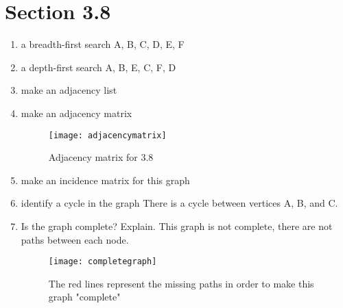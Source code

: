 \documentclass[11pt]{article}
\begin{document}
\section*{Section 3.8}
\begin{enumerate}
    \item a breadth-first search \newline
    A, B, C, D, E, F
    
    \item a depth-first search \newline
    A, B, E, C, F, D
    
    \item make an adjacency list
    
    \item make an adjacency matrix
    \begin{figure}
        \centering
        \texttt{[image: adjacencymatrix]}
        \caption{Adjacency matrix for 3.8}
        \label{fig:my_label}
    \end{figure}
    \item make an incidence matrix for this graph
    
    \item identify a cycle in the graph \newline
    There is a cycle between vertices A, B, and C.
    
    \item Is the graph complete? Explain. \newline
    This graph is not complete, there are not paths between each node.
    
    \begin{figure}
        \centering
        \texttt{[image: completegraph]}
        \caption{The red lines represent the missing paths in order to make this graph "complete"}
        \label{fig:my_label}
    \end{figure}
\end{enumerate}
\end{document}
